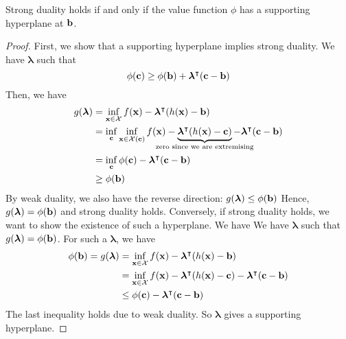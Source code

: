 \begin{theorem}
	Strong duality holds if and only if the value function \( \phi \) has a supporting hyperplane at \( \vb b \).
\end{theorem}
\begin{proof}
	First, we show that a supporting hyperplane implies strong duality.
	We have \( \bm \lambda \) such that
	\[
		\phi(\vb c) \geq \phi(\vb b) + \bm\lambda^\intercal (\vb c - \vb b)
	\]
	Then, we have
	\begin{align*}
		g(\bm \lambda) & = \inf_{\vb x \in \mathcal X} f(\vb x) - \bm\lambda^\transpose (h(\vb x) - \vb b)                                                                                                                           \\
		               & = \inf_{\vb c} \inf_{\vb x \in \mathcal X(\vb c)} f(\vb x) - \underbrace{\bm\lambda^\transpose (h(\vb x) - \vb c)}_{\mathclap{\text{zero since we are extremising}}} - \bm\lambda^\transpose(\vb c - \vb b) \\
		               & = \inf_{\vb c} \phi(\vb c) - \bm\lambda^\transpose(\vb c - \vb b)                                                                                                                                           \\
		               & \geq \phi(\vb b)
	\end{align*}
	By weak duality, we also have the reverse direction: \( g(\bm \lambda) \leq \phi(\vb b) \)
	Hence, \( g(\bm \lambda) = \phi(\vb b) \) and strong duality holds.
	Conversely, if strong duality holds, we want to show the existence of such a hyperplane.
	We have We have \( \bm \lambda \) such that \( g(\bm \lambda) = \phi(\vb b) \).
	For such a \( \bm \lambda \), we have
	\begin{align*}
		\phi(\vb b) = g(\bm \lambda) & = \inf_{\vb x \in \mathcal X} f(\vb x) - \bm\lambda^\intercal (h(\vb x) - \vb b)                                        \\
		                             & = \inf_{\vb x \in \mathcal X} f(\vb x) - \bm\lambda^\intercal (h(\vb x) - \vb c) - \bm\lambda^\intercal(\vb c - \vb b) \\
		                             & \leq \phi(\vb c) - \bm\lambda^\intercal(\vb c - \vb b)
	\end{align*}
	The last inequality holds due to weak duality.
	So \( \bm \lambda \) gives a supporting hyperplane.
\end{proof}

